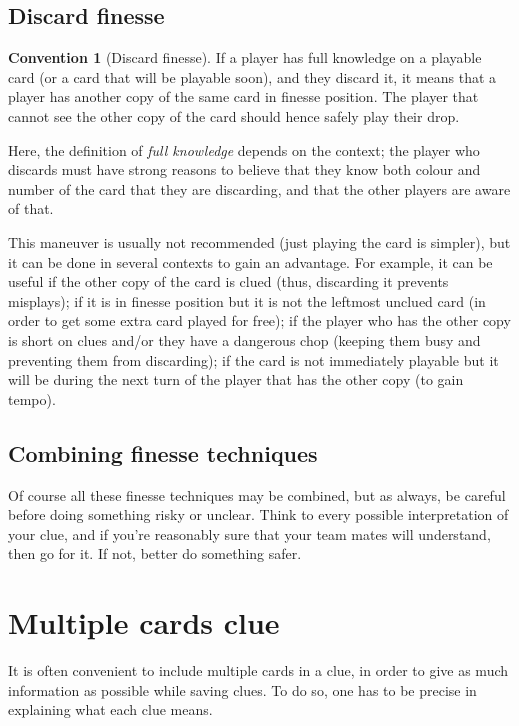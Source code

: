 \documentclass[a4paper]{article}
\theoremstyle{plain}
\theoremstyle{definition}
\newtheorem{convention}[theorem]{Convention}
\begin{document}
\subsection{Discard finesse}

\begin{convention}[Discard finesse]
	If a player has full knowledge on a playable card (or a card that will be playable soon), and they discard it, it means that a player has another copy of the same card in finesse position. The player that cannot see the other copy of the card should hence safely play their drop.
\end{convention}

Here, the definition of \emph{full knowledge} depends on the context; the player who discards must have strong reasons to believe that they know both colour and number of the card that they are discarding, and that the other players are aware of that.

This maneuver is usually not recommended (just playing the card is simpler), but it can be done in several contexts to gain an advantage. For example, it can be useful if the other copy of the card is clued (thus, discarding it prevents misplays); if it is in finesse position but it is not the leftmost unclued card (in order to get some extra card played for free); if the player who has the other copy is short on clues and/or they have a dangerous chop (keeping them busy and preventing them from discarding); if the card is not immediately playable but it will be during the next turn of the player that has the other copy (to gain tempo).

\subsection{Combining finesse techniques}

Of course all these finesse techniques may be combined, but as always, be careful before doing something risky or unclear. Think to every possible interpretation of your clue, and if you're reasonably sure that your team mates will understand, then go for it. If not, better do something safer.

\section{Multiple cards clue}

It is often convenient to include multiple cards in a clue, in order to give as much information as possible while saving clues. To do so, one has to be precise in explaining what each clue means.
\end{document}
